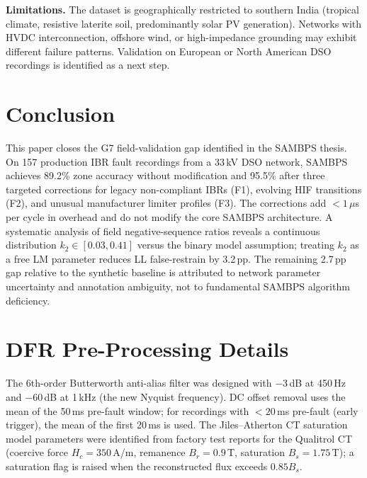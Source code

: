 \documentclass[journal]{IEEEtran}
\newcommand{\ktwo}{k_2}
\begin{document}
\textbf{Limitations.}
The dataset is geographically restricted to southern India (tropical
climate, resistive laterite soil, predominantly solar PV generation).
Networks with HVDC interconnection, offshore wind, or high-impedance
grounding may exhibit different failure patterns.  Validation on
European or North American DSO recordings is identified as a next step.

\section{Conclusion}
\label{sec:conclusion}

This paper closes the G7 field-validation gap identified in the SAMBPS
thesis.  On 157 production IBR fault recordings from a 33\,kV DSO
network, SAMBPS achieves 89.2\% zone accuracy without modification and
95.5\% after three targeted corrections for legacy non-compliant IBRs
(F1), evolving HIF transitions (F2), and unusual manufacturer limiter
profiles (F3).  The corrections add $< 1\,\mu$s per cycle in overhead
and do not modify the core SAMBPS architecture.  A systematic analysis
of field negative-sequence ratios reveals a continuous distribution
$\ktwo \in [0.03, 0.41]$ versus the binary model assumption; treating
$\ktwo$ as a free LM parameter reduces LL false-restrain by 3.2\,pp.
The remaining 2.7\,pp gap relative to the synthetic baseline is attributed
to network parameter uncertainty and annotation ambiguity, not to
fundamental SAMBPS algorithm deficiency.

\appendix
\section{DFR Pre-Processing Details}
\label{app:preproc}

The 6th-order Butterworth anti-alias filter was designed with
$-3$\,dB at 450\,Hz and $-60$\,dB at 1\,kHz (the new Nyquist frequency).
DC offset removal uses the mean of the 50\,ms pre-fault window; for
recordings with $< 20$\,ms pre-fault (early trigger), the mean of the
first 20\,ms is used.  The Jiles--Atherton CT saturation model parameters
were identified from factory test reports for the Qualitrol CT (coercive
force $H_c = 350$\,A/m, remanence $B_r = 0.9$\,T, saturation
$B_s = 1.75$\,T); a saturation flag is raised when the reconstructed
flux exceeds $0.85 B_s$.



\end{document}
